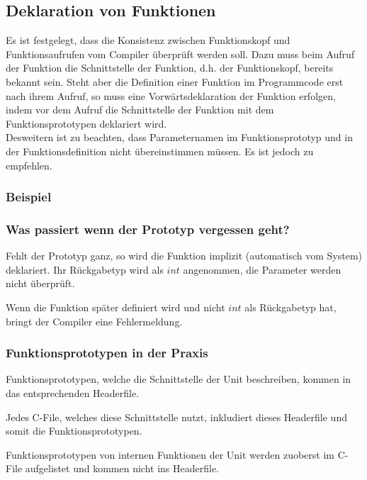 	\subsection{Deklaration von Funktionen }
		Es ist festgelegt, dass die Konsistenz zwischen Funktionskopf und Funktionsaufrufen vom Compiler überprüft werden soll. Dazu muss beim Aufruf der Funktion die Schnittstelle der Funktion, d.h. der Funktionskopf, bereits bekannt sein. Steht aber die Definition einer Funktion im Programmcode erst nach ihrem Aufruf, so muss eine Vorwärtsdeklaration der Funktion erfolgen, indem vor dem Aufruf die Schnittstelle der Funktion mit dem Funktionsprototypen deklariert wird. \\
		Desweitern ist zu beachten, dass Parameternamen im Funktionsprototyp und in der Funktionsdefinition nicht übereinstimmen müssen. Es ist jedoch zu empfehlen.
		
		\begin{minipage}[t]{9.5 cm}
			\subsubsection{Beispiel}
					
		\end{minipage}
		\hspace*{0.5cm}
		\begin{minipage}[t]{7.5 cm}	
			\subsubsection{Was passiert wenn der Prototyp vergessen geht?}
				\begin{compactitem}
					\item Fehlt der Prototyp ganz, so wird die Funktion implizit (automatisch vom System) deklariert. Ihr Rückgabetyp wird als $int$ angenommen, die Parameter werden nicht überprüft.
					\item Wenn die Funktion später definiert wird und nicht $int$ als Rückgabetyp hat, bringt der Compiler eine Fehlermeldung.
				\end{compactitem}
		\end{minipage}
		
		\subsubsection{Funktionsprototypen in der Praxis }
			\begin{compactitem}
				\item Funktionsprototypen, welche die Schnittstelle der Unit beschreiben, kommen in das entsprechenden Headerfile.
				\item Jedes C-File, welches diese Schnittstelle nutzt, inkludiert dieses Headerfile und somit die Funktionsprototypen.
				\item Funktionsprototypen von internen Funktionen der Unit werden zuoberst im C-File aufgelistet und kommen nicht ins Headerfile.
			\end{compactitem}